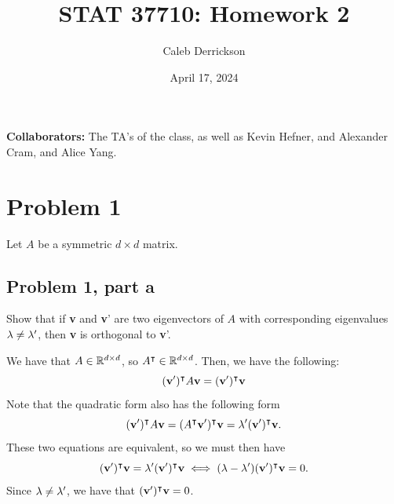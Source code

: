 

\title{STAT 37710: Homework 2}
\author{Caleb Derrickson}
\date{April 17, 2024}


\onehalfspacing
\maketitle
\allowdisplaybreaks
{\color{cit}\vspace{2mm}\noindent\textbf{Collaborators:}} The TA's of the class, as well as Kevin Hefner, and Alexander Cram, and Alice Yang.

\tableofcontents

\newcommand{\scS}{\mathcal{S}}


\newpage
\section{Problem 1} 
Let $A$ be a symmetric $d \times d$ matrix.
\subsection{Problem 1, part a}
Show that if \textbf{v} and \textbf{v}' are two eigenvectors of $A$ with corresponding eigenvalues $\mathrm{\lambda} \neq \mathrm{\lambda}'$, then \textbf{v} is orthogonal to \textbf{v}'.
\partbreak
\begin{solution}

    We have that $A \in \mathbb{R}^{d\times d}$, so $A^{\intercal} \in \mathbb{R}^{d\times d}$. Then, we have the following:
    \[(\textbf{v}')^{\intercal} A \textbf{v} = (\textbf{v}')^{\intercal} \textbf{v}\]
    Note that the quadratic form also has the following form
    \[(\textbf{v}')^{\intercal} A \textbf{v} = (A^{\intercal}\textbf{v}')^{\intercal} \textbf{v} = \mathrm{\lambda}' (\textbf{v}')^{\intercal} \textbf{v}.\]
    These two equations are equivalent, so we must then have 
    \[(\textbf{v}')^{\intercal} \textbf{v} = \mathrm{\lambda}' (\textbf{v}')^{\intercal} \textbf{v} \iff (\mathrm{\lambda} - \mathrm{\lambda}') (\textbf{v}')^{\intercal} \textbf{v} = 0.\]
    Since $\mathrm{\lambda} \neq \mathrm{\lambda}'$, we have that $(\textbf{v}')^{\intercal} \textbf{v} = 0$. 
\end{solution}

\newpage
